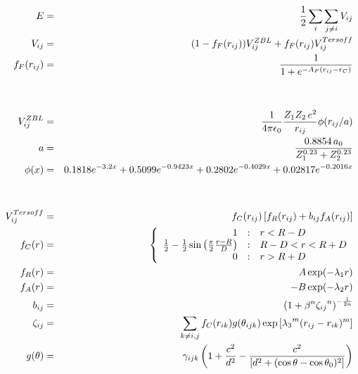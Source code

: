 \documentclass[12pt]{article}
\begin{document}
\begin{eqnarray*}
  E & = & \frac{1}{2} \sum_i \sum_{j \neq i} V_{ij} \\
  V_{ij} & = & (1 - f_F(r_{ij})) V^{ZBL}_{ij} + f_F(r_{ij}) V^{Tersoff}_{ij} \\
f_F(r_{ij}) & = & \frac{1}{1 + e^{-A_F(r_{ij} - r_C)}}\\
  \\
  \\
  V^{ZBL}_{ij} & = & \frac{1}{4\pi\epsilon_0} \frac{Z_1 Z_2 \,e^2}{r_{ij}} \phi(r_{ij}/a) \\
  a & = & \frac{0.8854\,a_0}{Z_{1}^{0.23} + Z_{2}^{0.23}}\\
  \phi(x) & = & 0.1818e^{-3.2x} + 0.5099e^{-0.9423x} + 0.2802e^{-0.4029x} + 0.02817e^{-0.2016x}\\
  \\
  \\
  V^{Tersoff}_{ij} & = & f_C(r_{ij}) \left[ f_R(r_{ij}) + b_{ij} f_A(r_{ij}) \right] \\
  f_C(r) & = & \left\{ \begin{array} {r@{\quad:\quad}l}
    1 & r < R - D \\
    \frac{1}{2} - \frac{1}{2} \sin \left( \frac{\pi}{2} \frac{r-R}{D} \right) &
      R-D < r < R + D \\
    0 & r > R + D
    \end{array} \right. \\
  f_R(r) & = & A \exp (-\lambda_1 r) \\
  f_A(r) & = & -B \exp (-\lambda_2 r) \\
  b_{ij} & = & \left( 1 + \beta^n {\zeta_{ij}}^n \right)^{-\frac{1}{2n}} \\
  \zeta_{ij} & = & \sum_{k \neq i,j} f_C(r_{ik}) g(\theta_{ijk})
                   \exp \left[ {\lambda_3}^m (r_{ij} - r_{ik})^m \right] \\
  g(\theta) & = & \gamma_{ijk} \left( 1 + \frac{c^2}{d^2} - 
                  \frac{c^2}{\left[ d^2 + 
		  (\cos \theta - \cos \theta_0)^2\right]} \right)
\end{eqnarray*}                           
\end{document}
